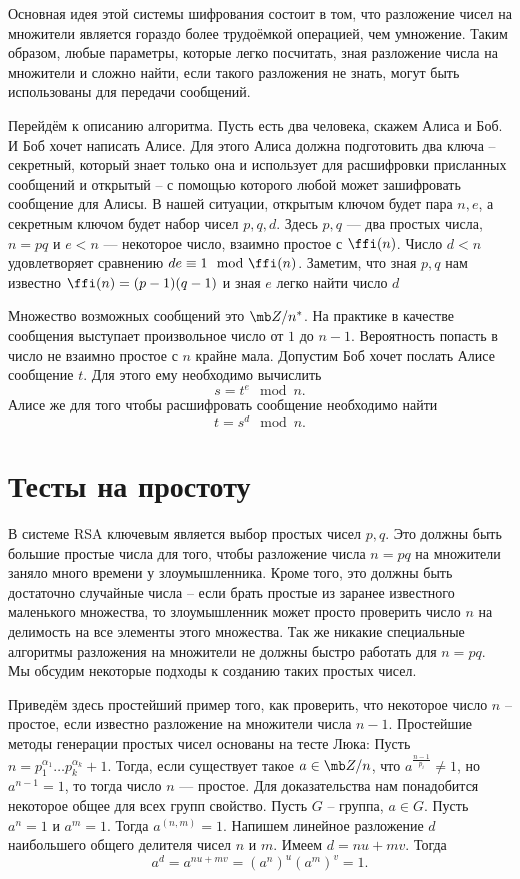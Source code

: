 Основная идея этой системы шифрования состоит в том, что разложение  чисел на множители является гораздо более трудоёмкой операцией, чем  умножение. Таким образом, любые параметры, которые легко посчитать, зная разложение числа на множители и сложно найти, если такого разложения не знать, могут быть использованы для передачи сообщений.

Перейдём к описанию алгоритма. Пусть есть два человека, скажем Алиса и Боб. И Боб хочет написать Алисе. Для этого Алиса должна подготовить два ключа --  секретный, который знает только она и использует для расшифровки присланных сообщений и открытый -- с помощью которого любой может зашифровать сообщение для Алисы. В нашей ситуации, открытым ключом будет пара $n,e$, а секретным ключом будет набор чисел $p,q,d$. Здесь $p,q$ --- два простых числа, $n=pq$  и  $e<n$ --- некоторое число, взаимно простое с $\ffi(n)$. Число $d<n$ удовлетворяет сравнению $de\equiv 1\mod \ffi(n)$. Заметим, что зная $p,q$ нам известно $\ffi(n)=(p-1)(q-1)$ и зная $e$ легко найти число $d$

Множество возможных сообщений это $\mb Z/n^*$. На практике в качестве сообщения выступает произвольное число от $1$ до $n-1$. Вероятность попасть в число не взаимно простое с $n$ крайне мала.  Допустим Боб хочет послать Алисе сообщение $t$. Для этого ему необходимо вычислить 
$$s=t^e\mod n.$$
Алисе же для того чтобы расшифровать сообщение необходимо найти
$$t=s^d \mod n.$$



\section{Тесты на простоту}
В системе RSA ключевым является выбор простых чисел $p,q$. Это должны быть большие простые числа для того, чтобы разложение числа $n=pq$ на множители заняло много времени у злоумышленника. Кроме того, это должны быть достаточно случайные числа -- если брать простые из заранее известного маленького множества, то злоумышленник может просто проверить число $n$ на делимость на все элементы этого множества. Так же никакие специальные алгоритмы разложения на множители не должны быстро работать для $n=pq$. Мы обсудим некоторые подходы к созданию таких простых чисел.

Приведём здесь простейший пример того, как проверить, что некоторое число $n$ -- простое, если известно разложение на множители числа $n-1$. Простейшие методы генерации простых чисел основаны на тесте Люка:
 Пусть $n=p_1^{\alpha_1}\dots p_k^{\alpha_k}+1$. Тогда, если существует такое  $a\in \mb Z/n$, что $a^{\frac{n-1}{p_i}}\neq 1 $, но $a^{n-1} = 1$, то тогда число $n$ --- простое.
\ethrm  
Для доказательства нам понадобится некоторое общее для всех групп свойство.
\lm Пусть $G$ -- группа, $a\in G$. Пусть $a^n=1$ и $a^m=1$. Тогда $a^{(n,m)}=1$. 
\elm
\proof Напишем линейное разложение $d$ наибольшего общего делителя чисел $n$  и $m$. Имеем $d=nu+mv$. Тогда
$$a^d= a^{nu+mv}=(a^n)^u (a^m)^v=1.$$
\endproof

